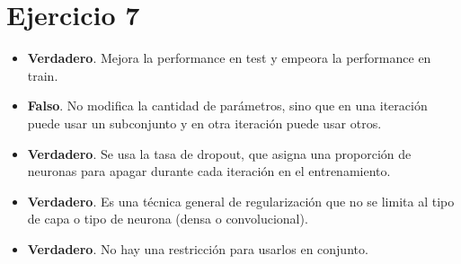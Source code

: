 \documentclass[12pt, a4paper]{article}
\begin{document}
    \section*{Ejercicio 7}
        \begin{itemize}
            \item \textbf{Verdadero}. Mejora la performance en test y empeora la performance en train.
            \item \textbf{Falso}. No modifica la cantidad de parámetros, sino que en una iteración puede usar un subconjunto y en otra iteración puede usar otros.
            \item \textbf{Verdadero}. Se usa la tasa de dropout, que asigna una proporción de neuronas para apagar durante cada iteración en el entrenamiento.
            \item \textbf{Verdadero}. Es una técnica general de regularización que no se limita al tipo de capa o tipo de neurona (densa o convolucional).
            \item \textbf{Verdadero}. No hay una restricción para usarlos en conjunto.
        \end{itemize}
\end{document}
